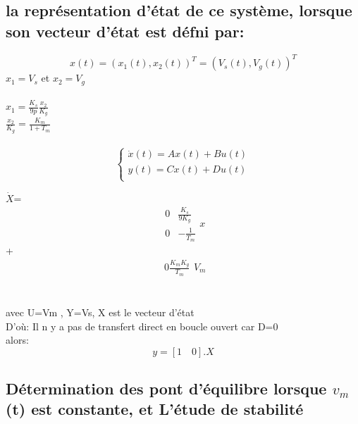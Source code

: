 \documentclass[12pt, a4paper, openany]{report}
\begin{document}
\subsection{la représentation d’état de ce système, lorsque son vecteur d’état est défni par:}


\begin{equation}
x(t)={(x_1(t),x_2(t))}^T={(V_s(t),V_g(t))}^T
\end{equation}
$x_1=V_s$ et $x_2=V_g$
\\\\


$x_1=\frac{K_s}{9p}\frac{x_2}{K_g}$\\
$\frac{x_2}{K_g}=\frac{K_m}{1+T_m}$
\\
\\

\begin{equation*}
\left\{\begin{matrix}
\dot{x}(t)=Ax(t)+Bu(t)\\ 
y(t)=Cx(t)+Du(t)\\
\end{matrix}\right.
\end{equation*}   

$\dot{X}$=$$\begin{matrix}0&\frac{K_s}{9K_g}\\0&-\frac{1}{T_m}\end{matrix}x$$
\quad+\quad $$\begin{matrix}0
\frac{K_mK_g}{T_m}
\end{matrix}V_m
$$
\\\\

avec U=Vm , Y=Vs, X est le vecteur d'état\\
D'où: Il n y a  pas de transfert direct en boucle ouvert car D=0\\
alors: $$y=[1\quad0].X$$ 



\subsection{Détermination des pont d’équilibre lorsque $v_m$(t) est constante, et L’étude de stabilité }








\end{document}
